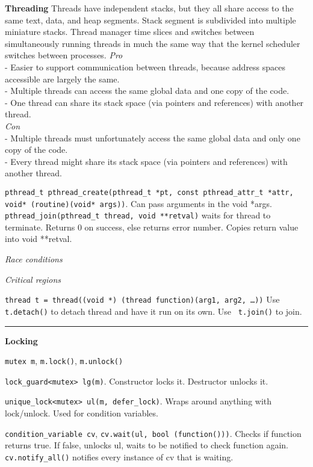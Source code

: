 \documentclass{article}
\begin{document}
\begin{multicols}{2}
  {\bf Threading}
  Threads have independent stacks, but they all share access to the same text,
  data, and heap segments. Stack segment is subdivided into multiple miniature
  stacks. Thread manager time slices and switches between simultaneously running
  threads in much the same way that the kernel scheduler switches between
  processes.
  {\it Pro}\\
  - Easier to support communication between threads, because address spaces
  accessible are largely the same.\\
  - Multiple threads can access the same global data and one copy of the code.\\
  - One thread can share its stack space (via pointers and references) with
  another thread.\\
  {\it Con}\\
  - Multiple threads must unfortunately access the same global data and only one
  copy of the code.\\
  - Every thread might share its stack space (via pointers and references) with
  another thread.

  {\tt pthread\_t pthread\_create(pthread\_t *pt, const pthread\_attr\_t *attr,
  void* (routine)(void* args))}. Can pass arguments in the void *args.\\
  {\tt pthread\_join(pthread\_t thread, void **retval)} waits for thread to
  terminate. Returns 0 on success, else returns error number. Copies return
  value into void **retval.

  {\it Race conditions}

  {\it Critical regions}

  {\tt thread t = thread((void *) (thread function)(arg1, arg2, \ldots))} Use
  {\tt t.detach()} to detach thread and have it run on its own. Use {\tt
  t.join()} to join.

  \noindent\rule{4cm}{0.4pt}

  {\bf Locking}

  {\tt mutex m}, {\tt m.lock()}, {\tt m.unlock()}

  {\tt lock\_guard<mutex> lg(m)}. Constructor locks it. Destructor unlocks it.

  {\tt unique\_lock<mutex> ul(m, defer\_lock)}. Wraps around anything with
  lock/unlock. Used for condition variables.

  {\tt condition\_variable cv}, {\tt cv.wait(ul, bool (function()))}. Checks if
  function returns true. If false, unlocks ul, waits to be notified to check
  function again. {\tt cv.notify\_all()} notifies every instance of cv that is
  waiting.


\end{multicols}
\end{document}
